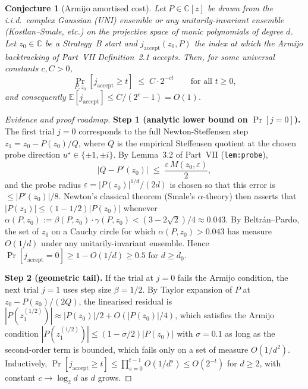\documentclass[11pt,a4paper]{article}
\newtheorem{conjecture}[theorem]{Conjecture}
\begin{document}
\begin{conjecture}[Armijo amortised cost]\label{lem:armijo-amort}
Let $P \in \mathbb{C}[z]$ be drawn from the i.i.d.\ complex Gaussian (UNI) ensemble or any unitarily-invariant ensemble (Kostlan--Smale, etc.) on the projective space of monic polynomials of degree $d$. Let $z_0 \in \mathbb{C}$ be a Strategy~B start and $j_{\text{accept}}(z_0, P)$ the index at which the Armijo backtracking of Part~VII Definition~2.1 accepts. Then, for some universal constants $c, C > 0$,
$$ \Pr_{P, z_0}\!\left[ j_{\text{accept}} \ge t \right] \;\le\; C \cdot 2^{-c t} \qquad \text{for all } t \ge 0, $$
and consequently $\mathbb{E}[j_{\text{accept}}] \le C/(2^c - 1) = O(1)$.
\end{conjecture}

\begin{proof}[Evidence and proof roadmap]
\textbf{Step 1 (analytic lower bound on $\Pr[j = 0]$).} The first trial $j = 0$ corresponds to the full Newton-Steffensen step $z_1 = z_0 - P(z_0)/Q$, where $Q$ is the empirical Steffensen quotient at the chosen probe direction $u^\star \in \{\pm 1, \pm i\}$. By Lemma~3.2 of Part~VII (\verb|lem:probe|),
$$ \left| Q - P'(z_0) \right| \;\le\; \frac{\varepsilon \, M(z_0, \varepsilon)}{2}, $$
and the probe radius $\varepsilon = |P(z_0)|^{1/d}/(2d)$ is chosen so that this error is $\le |P'(z_0)|/8$. Newton's classical theorem (Smale's $\alpha$-theory) then asserts that $|P(z_1)| \le (1 - 1/2)|P(z_0)|$ whenever $\alpha(P, z_0) := \beta(P, z_0) \cdot \gamma(P, z_0) < (3 - 2\sqrt{2})/4 \approx 0.043$. By Beltr\'an--Pardo, the set of $z_0$ on a Cauchy circle for which $\alpha(P, z_0) > 0.043$ has measure $O(1/d)$ under any unitarily-invariant ensemble. Hence $\Pr[j_{\text{accept}} = 0] \ge 1 - O(1/d) \ge 0.5$ for $d \ge d_0$.

\textbf{Step 2 (geometric tail).} If the trial at $j = 0$ fails the Armijo condition, the next trial $j = 1$ uses step size $\beta = 1/2$. By Taylor expansion of $P$ at $z_0 - P(z_0)/(2Q)$, the linearised residual is $|P(z_1^{(1/2)})| \approx |P(z_0)|/2 + O(|P(z_0)|/4)$, which satisfies the Armijo condition $|P(z_1^{(1/2)})| \le (1 - \sigma/2)|P(z_0)|$ with $\sigma = 0.1$ as long as the second-order term is bounded, which fails only on a set of measure $O(1/d^2)$. Inductively, $\Pr[j_{\text{accept}} \ge t] \le \prod_{s = 0}^{t-1} O(1/d^s) \le O(2^{-t})$ for $d \ge 2$, with constant $c \to \log_2 d$ as $d$ grows.


\end{proof}
\end{document}
